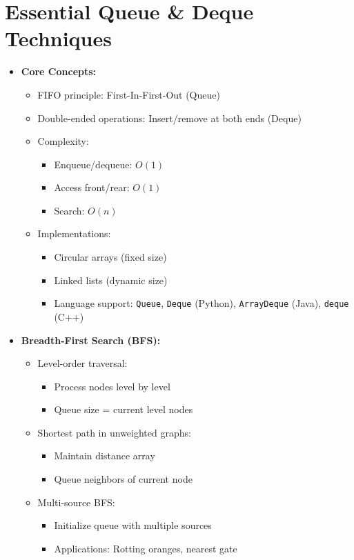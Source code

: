 \documentclass[a4paper,10pt]{book}
\begin{document}
\chapter{Essential Queue \& Deque Techniques }
\label{sec:queue}
\begin{itemize}
    \item \textbf{Core Concepts:}
    \begin{itemize}
        \item FIFO principle: First-In-First-Out (Queue)
        \item Double-ended operations: Insert/remove at both ends (Deque)
        \item Complexity:
        \begin{itemize}
            \item Enqueue/dequeue: $O(1)$
            \item Access front/rear: $O(1)$
            \item Search: $O(n)$
        \end{itemize}
        \item Implementations:
        \begin{itemize}
            \item Circular arrays (fixed size)
            \item Linked lists (dynamic size)
            \item Language support: \texttt{Queue}, \texttt{Deque} (Python), \texttt{ArrayDeque} (Java), \texttt{deque} (C++)
        \end{itemize}
    \end{itemize}
    
    \item \textbf{Breadth-First Search (BFS):}
    \begin{itemize}
        \item Level-order traversal:
        \begin{itemize}
            \item Process nodes level by level
            \item Queue size = current level nodes
        \end{itemize}
        \item Shortest path in unweighted graphs:
        \begin{itemize}
            \item Maintain distance array
            \item Queue neighbors of current node
        \end{itemize}
        \item Multi-source BFS:
        \begin{itemize}
            \item Initialize queue with multiple sources
            \item Applications: Rotting oranges, nearest gate
        \end{itemize}
    \end{itemize}
    

\end{itemize}
\end{document}
